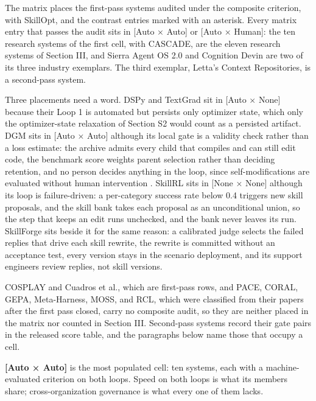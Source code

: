 \documentclass[
]{article}
\begin{document}
The matrix places the first-pass systems audited under the composite
criterion, with SkillOpt, and the contrast entries marked with an
asterisk. Every matrix entry that passes the audit sits in {[}Auto ×
Auto{]} or {[}Auto × Human{]}: the ten research systems of the first
cell, with CASCADE, are the eleven research systems of Section III, and
Sierra Agent OS 2.0 and Cognition Devin are two of its three industry
exemplars. The third exemplar, Letta's Context Repositories, is a
second-pass system.

Three placements need a word. DSPy and TextGrad sit in {[}Auto × None{]}
because their Loop 1 is automated but persists only optimizer state,
which only the optimizer-state relaxation of Section S2 would count as a
persisted artifact. DGM sits in {[}Auto × Auto{]} although its local
gate is a validity check rather than a loss estimate: the archive admits
every child that compiles and can still edit code, the benchmark score
weights parent selection rather than deciding retention, and no person
decides anything in the loop, since self-modifications are evaluated
without human intervention \cite{zhang2025darwin}. SkillRL sits in
{[}None × None{]} although its loop is failure-driven: a per-category
success rate below 0.4 triggers new skill proposals, and the skill bank
takes each proposal as an unconditional union, so the step that keeps an
edit runs unchecked, and the bank never leaves its run. SkillForge sits
beside it for the same reason: a calibrated judge selects the failed
replies that drive each skill rewrite, the rewrite is committed without
an acceptance test, every version stays in the scenario deployment, and
its support engineers review replies, not skill versions.

COSPLAY and Cuadros et al., which are first-pass rows, and PACE, CORAL,
GEPA, Meta-Harness, MOSS, and RCL, which were classified from their
papers after the first pass closed, carry no composite audit, so they
are neither placed in the matrix nor counted in Section III. Second-pass
systems record their gate pairs in the released score table, and the
paragraphs below name those that occupy a cell.

\textbf{{[}Auto × Auto{]}} is the most populated cell: ten systems, each
with a machine-evaluated criterion on both loops. Speed on both loops is
what its members share; cross-organization governance is what every one
of them lacks.
\end{document}
